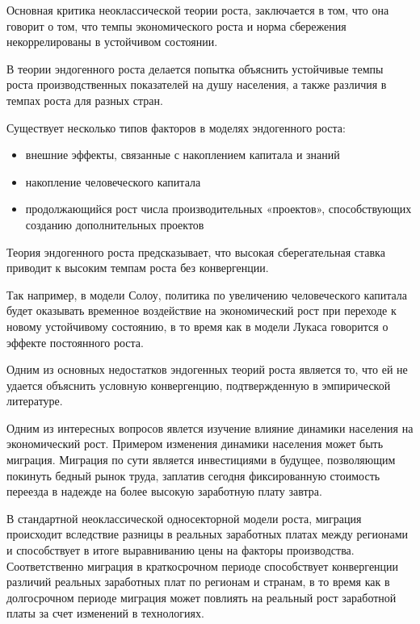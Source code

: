 \documentclass[12pt,a4paper, oneside]{extreport}
\begin{document}
Основная критика неоклассической теории роста,  заключается в том, что 
она говорит о том, что темпы экономического роста и норма сбережения некоррелированы в устойчивом состоянии.


В теории эндогенного роста делается попытка объяснить 
устойчивые темпы роста  производственных показателей на душу населения, а также различия в темпах роста для разных стран.




Существует несколько  типов факторов в  моделях эндогенного роста: 
\begin{itemize}
	\item внешние эффекты, связанные  с  накоплением  капитала  и  знаний
	\item  накопление  человеческого капитала 	
	\item   продолжающийся рост числа  производительных «проектов», способствующих созданию дополнительных проектов
\end{itemize}


Теория эндогенного роста предсказывает, что высокая сберегательная ставка приводит к высоким темпам роста без конвергенции.


Так например, в модели  Солоу, политика по увеличению человеческого капитала  будет оказывать временное воздействие на экономический рост при  переходе  к новому  устойчивому состоянию,  в то время   как в модели Лукаса  говорится о   эффекте постоянного роста. 



Одним из основных недостатков эндогенных теорий роста является то, что ей не удается объяснить условную конвергенцию, подтвержденную  в эмпирической литературе.


Одним из интересных вопросов явлется изучение влияние динамики населения на экономический рост. 
Примером изменения динамики населения может быть миграция.
Миграция по сути является инвестициями в будущее, позволяющим покинуть   бедный  рынок труда, заплатив сегодня    фиксированную стоимость переезда в надежде на более высокую заработную плату завтра.

В стандартной неоклассической односекторной модели роста, миграция происходит вследствие разницы в  реальных заработных платах между регионами  и способствует в итоге  выравниванию цены на факторы производства. 
Соответственно миграция в краткосрочном периоде  способствует  конвергенции  различий реальных заработных плат по регионам и странам, в то время как в долгосрочном периоде  миграция может повлиять на реальный рост заработной платы за счет изменений в технологиях. 
\end{document}

